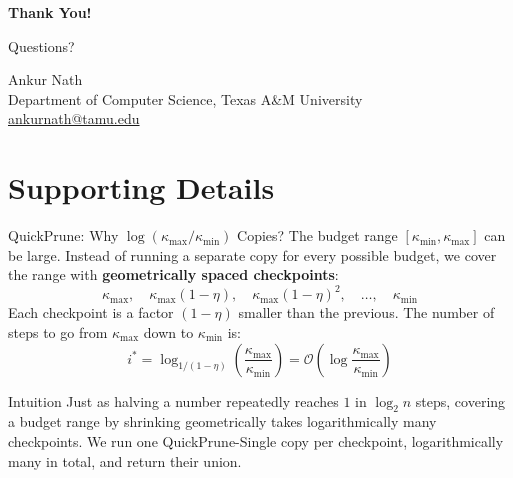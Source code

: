 \documentclass[aspectratio=169,xcolor=dvipsnames,8pt]{beamer}
\begin{document}
\begin{frame}[plain]
  \centering
  \vspace{1cm}
  \Huge \textbf{Thank You!}

  \vspace{0.8cm}
  \Large Questions?

  \vspace{1cm}
  \normalsize
  Ankur Nath\\
  \vspace{0.2cm}
  Department of Computer Science, Texas A\&M University\\
  \vspace{0.3cm}
  \small
  \href{mailto:ankurnath@tamu.edu}{ankurnath@tamu.edu}
\end{frame}

\section{Supporting Details}

\begin{frame}{QuickPrune: Why $\log(\kappa_{\max}/\kappa_{\min})$ Copies?}
  The budget range $[\kappa_{\min}, \kappa_{\max}]$ can be large. Instead of running
  a separate copy for every possible budget, we cover the range with
  \textbf{geometrically spaced checkpoints}:
  \[
    \kappa_{\max},\quad \kappa_{\max}(1-\eta),\quad \kappa_{\max}(1-\eta)^2,\quad \ldots,\quad \kappa_{\min}
  \]
  Each checkpoint is a factor $(1-\eta)$ smaller than the previous.
  The number of steps to go from $\kappa_{\max}$ down to $\kappa_{\min}$ is:
  \[
    i^* = \log_{1/(1-\eta)}\!\left(\frac{\kappa_{\max}}{\kappa_{\min}}\right)
    = \mathcal{O}\!\left(\log\frac{\kappa_{\max}}{\kappa_{\min}}\right)
  \]

  \begin{exampleblock}{Intuition}
    Just as halving a number repeatedly reaches $1$ in $\log_2 n$ steps, covering
    a budget range by shrinking geometrically takes logarithmically many checkpoints.
    We run one QuickPrune-Single copy per checkpoint, logarithmically many in
    total, and return their union.
  \end{exampleblock}
\end{frame}
\end{document}
